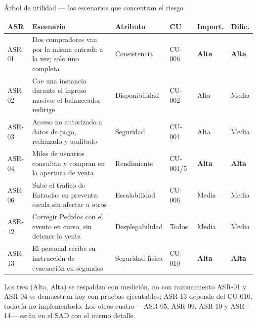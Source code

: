 \documentclass[aspectratio=169,10pt,xcolor={table}]{beamer}
\begin{document}
\begin{frame}{Árbol de utilidad --- los escenarios que concentran el riesgo}
  \scriptsize
  \begin{tabular}{C{1.2cm}L{4.4cm}L{2.1cm}C{1.5cm}C{1.3cm}C{1.3cm}}
    \toprule
    \textbf{ASR} & \textbf{Escenario} & \textbf{Atributo} & \textbf{CU} &
    \textbf{Import.} & \textbf{Dific.} \\
    \midrule
    ASR-01 & Dos compradores van por la misma entrada a la vez; solo uno completa &
      Consistencia & CU-006 & \textbf{Alta} & \textbf{Alta} \\
    ASR-02 & Cae una instancia durante el ingreso masivo; el balanceador redirige &
      Disponibilidad & CU-002 & Alta & Media \\
    ASR-03 & Acceso no autorizado a datos de pago, rechazado y auditado &
      Seguridad & CU-001 & Alta & Media \\
    ASR-04 & Miles de usuarios consultan y compran en la apertura de venta &
      Rendimiento & CU-001/5 & \textbf{Alta} & \textbf{Alta} \\
    ASR-06 & Sube el tráfico de Entradas en preventa; escala sin afectar a otros &
      Escalabilidad & CU-006 & Media & Media \\
    ASR-12 & Corregir Pedidos con el evento en curso, sin detener la venta &
      Desplegabilidad & Todos & Media & Media \\
    ASR-13 & El personal recibe su instrucción de evacuación en segundos &
      Seguridad física & CU-010 & \textbf{Alta} & \textbf{Alta} \\
    \bottomrule
  \end{tabular}

  \vspace{0.5em}
  \begin{alertblock}{Los tres (Alta, Alta) se respaldan con medición, no con razonamiento}
    \scriptsize ASR-01 y ASR-04 se demuestran hoy con pruebas ejecutables; ASR-13 depende del
    CU-010, todavía no implementado. Los otros cuatro ---ASR-05, ASR-09, ASR-10 y ASR-14---
    están en el SAD con el mismo detalle.
  \end{alertblock}
\end{frame}
\end{document}
